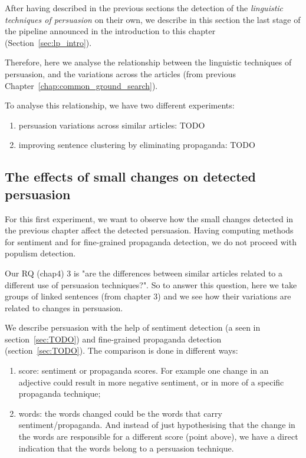 After having described in the previous sections the detection of the \emph{linguistic techniques of persuasion} on their own, we describe in this section the last stage of the pipeline announced in the introduction to this chapter (Section~\ref{sec:lp_intro}).

Therefore, here we analyse the relationship between the linguistic techniques of persuasion, and the variations across the articles (from previous Chapter~\ref{chap:common_ground_search}).

To analyse this relationship, we have two different experiments:

\begin{enumerate}
    \item persuasion variations across similar articles: TODO
    \item improving sentence clustering by eliminating propaganda: TODO
\end{enumerate}

\subsection{\statusorange The effects of small changes on detected persuasion}

For this first experiment, we want to observe how the small changes detected in the previous chapter affect the detected persuasion.
Having computing methods for sentiment and for fine-grained propaganda detection, we do not proceed with populism detection.

Our RQ (chap4) 3 is "are the differences between similar articles related to a different use of persuasion techniques?".
So to answer this question, here we take groups of linked sentences (from chapter 3) and we see how their variations are related to changes in persuasion.

We describe persuasion with the help of sentiment detection (a seen in section~\ref{sec:TODO}) and fine-grained propaganda detection (section~\ref{sec:TODO}).
The comparison is done in different ways:
\begin{enumerate}
    \item score: sentiment or propaganda scores. For example one change in an adjective could result in more negative sentiment, or in more of a specific propaganda technique;
    \item words: the words changed could be the words that carry sentiment/propaganda. And instead of just hypothesising that the change in the words are responsible for a different score (point above), we have a direct indication that the words belong to a persuasion technique.
\end{enumerate}

